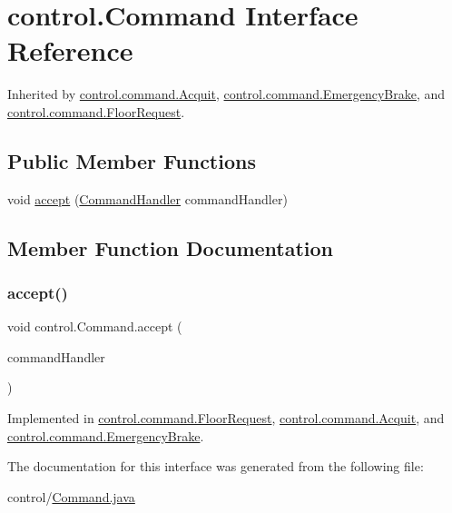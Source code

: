 \hypertarget{interfacecontrol_1_1_command}{}\section{control.\+Command Interface Reference}
\label{interfacecontrol_1_1_command}


Inherited by \mbox{\hyperlink{classcontrol_1_1command_1_1_acquit}{control.\+command.\+Acquit}}, \mbox{\hyperlink{classcontrol_1_1command_1_1_emergency_brake}{control.\+command.\+Emergency\+Brake}}, and \mbox{\hyperlink{classcontrol_1_1command_1_1_floor_request}{control.\+command.\+Floor\+Request}}.

\subsection*{Public Member Functions}
\begin{DoxyCompactItemize}
\item 
void \mbox{\hyperlink{interfacecontrol_1_1_command_ab81fb31e9d98dfbfbfb7026a5bc823a6}{accept}} (\mbox{\hyperlink{interfacecontrol_1_1_command_handler}{Command\+Handler}} command\+Handler)
\end{DoxyCompactItemize}


\subsection{Member Function Documentation}
\mbox{\label{interfacecontrol_1_1_command_ab81fb31e9d98dfbfbfb7026a5bc823a6}} 
\subsubsection{\texorpdfstring{accept()}{accept()}}
{\footnotesize\ttfamily void control.\+Command.\+accept (\begin{DoxyParamCaption}\item[{\mbox{\hyperlink{interfacecontrol_1_1_command_handler}{Command\+Handler}}}]{command\+Handler }\end{DoxyParamCaption})}



Implemented in \mbox{\hyperlink{classcontrol_1_1command_1_1_floor_request_a89db76c1649b41ee844fb79898ce4de2}{control.\+command.\+Floor\+Request}}, \mbox{\hyperlink{classcontrol_1_1command_1_1_acquit_a9b0f50417f8148f36c8afed609bdd78b}{control.\+command.\+Acquit}}, and \mbox{\hyperlink{classcontrol_1_1command_1_1_emergency_brake_adabaf905354a3c45d60c76dd94efd1e3}{control.\+command.\+Emergency\+Brake}}.



The documentation for this interface was generated from the following file\+:\begin{DoxyCompactItemize}
\item 
control/\mbox{\hyperlink{_command_8java}{Command.\+java}}\end{DoxyCompactItemize}
